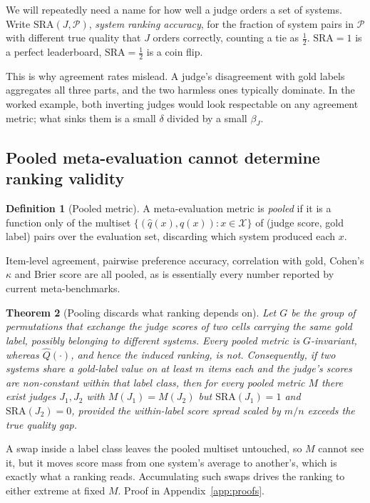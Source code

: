 \documentclass{article}
\theoremstyle{plain}
\newtheorem{theorem}{Theorem}
\theoremstyle{definition}
\newtheorem{definition}[theorem]{Definition}
\newcommand{\qhat}{\hat{q}}
\newcommand{\Qhat}{\hat{Q}}
\newcommand{\SRA}{\mathrm{SRA}}
\begin{document}
We will repeatedly need a name for how well a judge orders a set of systems. Write
$\SRA(J,\mathcal{P})$, \emph{system ranking accuracy}, for the fraction of system pairs in
$\mathcal{P}$ with different true quality that $J$ orders correctly, counting a tie as $\tfrac12$.
$\SRA=1$ is a perfect leaderboard, $\SRA=\tfrac12$ is a coin flip.

This is why agreement rates mislead. A judge's disagreement with gold labels aggregates all
three parts, and the two harmless ones typically dominate. In the worked example, both
inverting judges would look respectable on any agreement metric; what sinks them is a small
$\delta$ divided by a small $\beta_J$.

\subsection{Pooled meta-evaluation cannot determine ranking validity}

\begin{definition}[Pooled metric]
A meta-evaluation metric is \emph{pooled} if it is a function only of the multiset
$\{(\qhat(x),q(x)) : x\in\mathcal{X}\}$ of (judge score, gold label) pairs over the evaluation
set, discarding which system produced each $x$.
\end{definition}

Item-level agreement, pairwise preference accuracy, correlation with gold, Cohen's $\kappa$ and
Brier score are all pooled, as is essentially every number reported by current meta-benchmarks.

\begin{theorem}[Pooling discards what ranking depends on]
\label{thm:pooled}
Let $G$ be the group of permutations that exchange the judge scores of two cells carrying the
same gold label, possibly belonging to different systems. Every pooled metric is
$G$-invariant, whereas $\Qhat(\cdot)$, and hence the induced ranking, is not. Consequently, if
two systems share a gold-label value on at least $m$ items each and the judge's scores are
non-constant within that label class, then for every pooled metric $M$ there exist judges
$J_1,J_2$ with $M(J_1)=M(J_2)$ but $\SRA(J_1)=1$ and $\SRA(J_2)=0$, provided the within-label
score spread scaled by $m/n$ exceeds the true quality gap.
\end{theorem}

A swap inside a label class leaves the pooled multiset untouched, so $M$ cannot see it, but it
moves score mass from one system's average to another's, which is exactly what a ranking reads.
Accumulating such swaps drives the ranking to either extreme at fixed $M$. Proof in
Appendix~\ref{app:proofs}.
\end{document}
